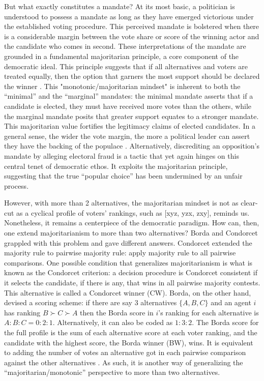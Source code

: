 \documentclass[hidelinks,11pt]{article} \usepackage[utf8]{inputenc}
\begin{document}
But what exactly constitutes a mandate? At its most basic, a politician is
understood to possess a mandate as long as they have emerged victorious under
the established voting procedure. This perceived mandate is bolstered when there
is a considerable margin between the vote share or score of the winning actor
and the candidate who comes in second. These interpretations of the mandate are
grounded in a fundamental majoritarian principle, a core component of the
democratic ideal. This principle suggests that if all alternatives and voters
are treated equally, then the option that garners the most support should be
declared the winner \parencite{dahl1989democracy}. This "monotonic/majoritarian
mindset" is inherent to both the ``minimal'' and the ``marginal'' mandates: the
minimal mandate asserts that if a candidate is elected, they must have received
more votes than the others, while the marginal mandate posits that greater
support equates to a stronger mandate. This majoritarian value fortifies the
legitimacy claims of elected candidates. In a general sense, the wider the vote
margin, the more a political leader can assert they have the backing of the
populace \parencite{grossman2022majoritarian}. Alternatively, discrediting an
opposition's mandate by alleging electoral fraud is a tactic that yet again
hinges on this central tenet of democratic ethos. It exploits the majoritarian
principle, suggesting that the true ``popular choice'' has been undermined by an
unfair process.

However, with more than 2 alternatives, the majoritarian mindset is not as
clear-cut as a cyclical profile of voters' rankings, such as [xyz, yzx, zxy],
reminds us. Nonetheless, it remains a centerpiece of the democratic paradigm.
How can, then, one extend majoritarianism to more than two alternatives? Borda
and Condorcet grappled with this problem and gave different answers. Condorcet
extended the majority rule to pairwise majority rule: apply majority rule to all
pairwise comparisons. One possible condition that generalizes majoritarianism is
what is known as the Condorcet criterion: a decision procedure is Condorcet
consistent if it selects the candidate, if there is any, that wins in all
pairwise majority contests. This alternative is called a Condorcet winner (CW).
Borda, on the other hand, devised a scoring scheme: if there are say 3
alternatives \(\{A,B,C\}\) and an agent \(i\) has ranking \(B\succ C\succ A\) then the
Borda score in \(i\)'s ranking for each alternative is \(A:B:C = 0:2:1\).
Alternatively, it can also be coded as \(1:3:2\). The Borda score for the full
profile is the sum of each alternative score at each voter ranking, and the
candidate with the highest score, the Borda winner (BW), wins. It is equivalent
to adding the number of votes an alternative got in each pairwise comparison
against the other alternatives \parencite{nurmi1999voting}. As such, it is
another way of generalizing the ``majoritarian/monotonic'' perspective to more
than two alternatives.
\end{document}

